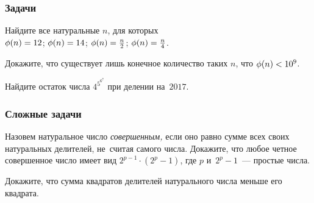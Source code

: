 \subsubsection*{Задачи}

\begin{problems}

\item
Найдите все натуральные $n$, для которых
\\
\subproblem $\phi(n) = 12$;
\quad
\subproblem $\phi(n) = 14$;
\quad
\subproblem $\phi(n) = \frac{n}{2}$;
\quad
\subproblem $\phi(n) = \frac{n}{4}$.

\item
Докажите, что существует лишь конечное количество таких $n$, что
$\phi(n) < 10^{9}$.

\item
Найдите остаток числа $4^{5^{6^7}}$ при делении на~$2017$.

\end{problems}


\subsubsection*{Сложные задачи}

\begin{problems}

\item
Назовем натуральное число \emph{совершенным,} если оно равно сумме всех своих
натуральных делителей, не~считая самого числа.
Докажите, что любое четное совершенное число имеет вид
$2^{p-1} \cdot (2^p - 1)$, где $p$ и~$2^p - 1$~--- простые числа.

\item
Докажите, что сумма квадратов делителей натурального числа меньше его квадрата.

\end{problems}

\endgroup %

